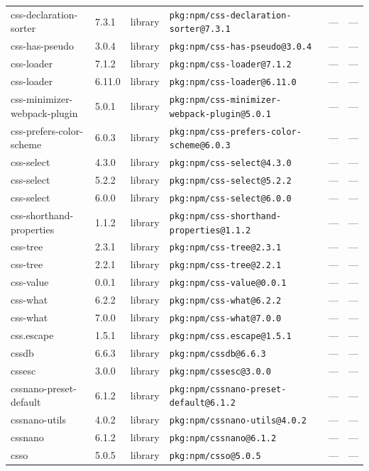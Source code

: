\documentclass[11pt]{article}
\begin{document}
\begin{longtable}{|l|l|l|p{2.2cm}|l|p{4cm}|}
css-declaration-sorter & 7.3.1 & library & \texttt{pkg:npm/css-declaration-sorter@7.3.1} & — & — \\
css-has-pseudo & 3.0.4 & library & \texttt{pkg:npm/css-has-pseudo@3.0.4} & — & — \\
css-loader & 7.1.2 & library & \texttt{pkg:npm/css-loader@7.1.2} & — & — \\
css-loader & 6.11.0 & library & \texttt{pkg:npm/css-loader@6.11.0} & — & — \\
css-minimizer-webpack-plugin & 5.0.1 & library & \texttt{pkg:npm/css-minimizer-webpack-plugin@5.0.1} & — & — \\
css-prefers-color-scheme & 6.0.3 & library & \texttt{pkg:npm/css-prefers-color-scheme@6.0.3} & — & — \\
css-select & 4.3.0 & library & \texttt{pkg:npm/css-select@4.3.0} & — & — \\
css-select & 5.2.2 & library & \texttt{pkg:npm/css-select@5.2.2} & — & — \\
css-select & 6.0.0 & library & \texttt{pkg:npm/css-select@6.0.0} & — & — \\
css-shorthand-properties & 1.1.2 & library & \texttt{pkg:npm/css-shorthand-properties@1.1.2} & — & — \\
css-tree & 2.3.1 & library & \texttt{pkg:npm/css-tree@2.3.1} & — & — \\
css-tree & 2.2.1 & library & \texttt{pkg:npm/css-tree@2.2.1} & — & — \\
css-value & 0.0.1 & library & \texttt{pkg:npm/css-value@0.0.1} & — & — \\
css-what & 6.2.2 & library & \texttt{pkg:npm/css-what@6.2.2} & — & — \\
css-what & 7.0.0 & library & \texttt{pkg:npm/css-what@7.0.0} & — & — \\
css.escape & 1.5.1 & library & \texttt{pkg:npm/css.escape@1.5.1} & — & — \\
cssdb & 6.6.3 & library & \texttt{pkg:npm/cssdb@6.6.3} & — & — \\
cssesc & 3.0.0 & library & \texttt{pkg:npm/cssesc@3.0.0} & — & — \\
cssnano-preset-default & 6.1.2 & library & \texttt{pkg:npm/cssnano-preset-default@6.1.2} & — & — \\
cssnano-utils & 4.0.2 & library & \texttt{pkg:npm/cssnano-utils@4.0.2} & — & — \\
cssnano & 6.1.2 & library & \texttt{pkg:npm/cssnano@6.1.2} & — & — \\
csso & 5.0.5 & library & \texttt{pkg:npm/csso@5.0.5} & — & — \\

\end{longtable}
\end{document}
